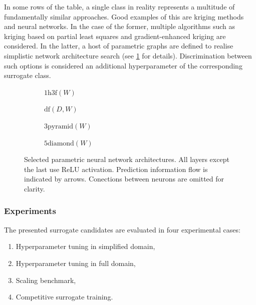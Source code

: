 In some rows of the table, a single class in reality represents a multitude of
fundamentally similar approaches. Good examples of this are kriging methods and neural
networks. In the case of the former, multiple algorithms such as kriging based on
partial least squares and gradient-enhanced kriging are considered. In the
latter, a host of parametric graphs are defined to realise simplistic network
architecture search (see \cref{fig:nn-archs} for details). Discrimination
between such options is considered an additional hyperparameter of the
corresponding surrogate class.

\begin{figure}[h]
	\centering
	\begin{subfigure}[b]{0.25\textwidth}
		\centering
		{\scriptsize {}}
		\caption{$\text{1h3f}(W)$}
	\end{subfigure}\hfill%
	\begin{subfigure}[b]{0.25\textwidth}
		\centering
		{\scriptsize {}}
		\caption{$\text{df}(D,W)$}
	\end{subfigure}\hfill%
	\begin{subfigure}[b]{0.25\textwidth}
		\centering
		{\scriptsize {}}
		\caption{$\text{3pyramid}(W)$}
	\end{subfigure}\hfill%
	\begin{subfigure}[b]{0.25\textwidth}
		\centering
		{\scriptsize {}}
		\caption{$\text{5diamond}(W)$}
	\end{subfigure}

	\caption{Selected parametric neural network architectures. All layers except
		the last use ReLU activation. Prediction information flow is indicated by
		arrows. Conections between neurons are omitted for clarity.}
	\label{fig:nn-archs}
\end{figure}

\subsubsection{Experiments}
\label{sec:experiment-methodology}

The presented surrogate candidates are evaluated in four experimental cases:

\begin{enumerate}
	
	\item Hyperparameter tuning in simplified domain,

	\item Hyperparameter tuning in full domain,

	\item Scaling benchmark,

	\item Competitive surrogate training.
\end{enumerate}

